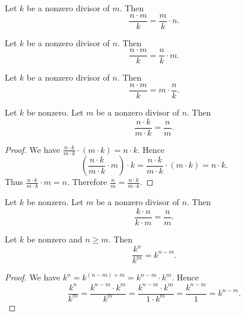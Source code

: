 \documentclass[../../arithmetic.tex]{subfiles}
\begin{document}
\begin{forthel}
    \begin{corollary}\label{Arithmetic_03_05_173047}
      Let $k$ be a nonzero divisor of $m$.
      Then \[ \frac{n \cdot m}{k} = \frac{m}{k} \cdot n. \]
    \end{corollary}

    \begin{corollary}\label{Arithmetic_03_05_401748}
      Let $k$ be a nonzero divisor of $n$.
      Then \[ \frac{n \cdot m}{k} = \frac{n}{k} \cdot m. \]
    \end{corollary}

    \begin{corollary}\label{Arithmetic_03_05_185037}
      Let $k$ be a nonzero divisor of $n$.
      Then \[ \frac{n \cdot m}{k} = m \cdot \frac{n}{k}. \]
    \end{corollary}

    \begin{proposition}\label{Arithmetic_03_05_243924}
      Let $k$ be nonzero.
      Let $m$ be a nonzero divisor of $n$.
      Then \[ \frac{n \cdot k}{m \cdot k} = \frac{n}{m}. \]
    \end{proposition}
    \begin{proof}
      We have $\frac{n \cdot k}{m \cdot k} \cdot (m \cdot k) = n \cdot k$.
      Hence
      \[  \left( \frac{n \cdot k}{m \cdot k} \cdot m \right) \cdot k
          = \frac{n \cdot k}{m \cdot k} \cdot (m \cdot k)
          = n \cdot k. \]
      Thus $\frac{n \cdot k}{m \cdot k} \cdot m = n$.
      Therefore $\frac{n}{m} = \frac{n \cdot k}{m \cdot k}$.
    \end{proof}

    \begin{corollary}\label{Arithmetic_03_05_424330}
      Let $k$ be nonzero.
      Let $m$ be a nonzero divisor of $n$.
      Then \[ \frac{k \cdot n}{k \cdot m} = \frac{n}{m}. \]
    \end{corollary}

    \begin{proposition}\label{Arithmetic_03_05_469833}
      Let $k$ be nonzero and $n \geq m$.
      Then \[ \frac{k^{n}}{k^{m}} = k^{n - m}. \]
    \end{proposition}
    \begin{proof}
      We have $k^{n} = k^{(n - m) + m} = k^{n - m} \cdot k^{m}$.
      Hence
      \[  \frac{k^{n}}{k^{m}}
          = \frac{k^{n - m} \cdot k^{m}}{k^{m}}
          = \frac{k^{n - m} \cdot k^{m}}{1 \cdot k^{m}}
          = \frac{k^{n - m}}{1}
          = k^{n - m}. \]
    \end{proof}
  \end{forthel}
\end{document}
